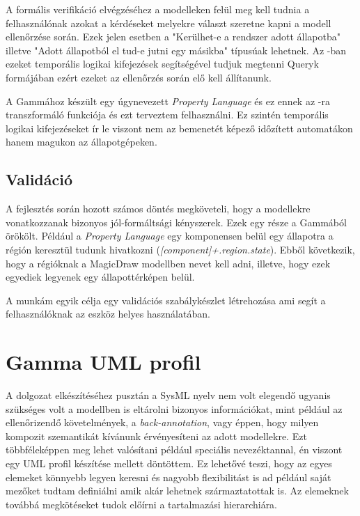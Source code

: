 A formális verifikáció elvégzéséhez a modelleken felül meg kell tudnia a felhasználónak azokat a kérdéseket melyekre választ szeretne kapni a modell ellenőrzése során. Ezek jelen esetben a "Kerülhet-e a rendszer adott állapotba" illetve "Adott állapotból el tud-e jutni egy másikba" típusúak lehetnek. Az \uppaal-ban ezeket temporális logikai kifejezések segítségével tudjuk megtenni \uppaal Queryk formájában ezért ezeket az ellenőrzés során elő kell állítanunk.

A Gammához készült egy úgynevezett \emph{Property Language} és ez ennek az \uppaal-ra transzformáló funkciója és ezt terveztem felhasználni. Ez szintén temporális logikai kifejezéseket ír le viszont nem az \uppaal bemenetét képező időzített automatákon hanem magukon az állapotgépeken.

\subsection{Validáció}

A fejlesztés során hozott számos döntés megköveteli, hogy a modellekre vonatkozzanak bizonyos jól-formáltsági kényszerek. Ezek egy része a Gammából örökölt. Például a \emph{Property Language} egy komponensen belül egy állapotra a régión keresztül tudunk hivatkozni (\emph{[component]+.region.state}). Ebből következik, hogy a régióknak a MagicDraw modellben nevet kell adni, illetve, hogy ezek egyediek legyenek egy állapottérképen belül.

A munkám egyik célja egy validációs szabálykészlet létrehozása ami segít a felhasználóknak az eszköz helyes használatában.

\newpage

\section{Gamma UML profil}

A dolgozat elkészítéséhez pusztán a SysML nyelv nem volt elegendő ugyanis szükséges volt  a modellben is eltárolni  bizonyos információkat, mint például az ellenőrizendő követelmények, a  \emph{back-annotation}, vagy éppen, hogy milyen kompozit szemantikát kívánunk érvényesíteni az adott modellekre. Ezt többféleképpen meg lehet valósítani például speciális nevezéktannal, én viszont egy UML profil készítése mellett döntöttem. Ez lehetővé teszi, hogy az egyes elemeket könnyebb legyen keresni és nagyobb flexibilitást is ad például saját mezőket tudtam definiálni amik akár lehetnek származtatottak is. Az elemeknek továbbá megkötéseket tudok előírni a tartalmazási hierarchiára.

